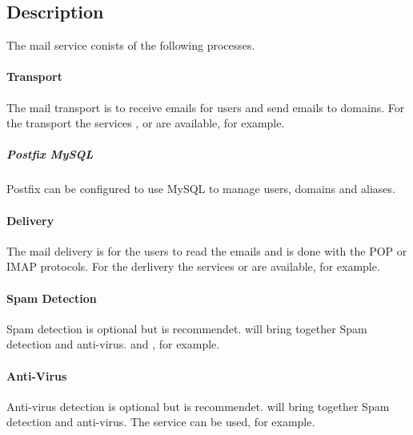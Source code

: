 \subsection{Description}

The mail service conists of the following processes.

\paragraph{Transport}

The mail transport is to receive emails for users and send emails to domains.
For the transport the services
\cite{sendmail},
\cite{postfix} or
\cite{exim}
are available, for example.

\subparagraph{Postfix MySQL}

Postfix can be configured to use MySQL to manage users, domains and aliases.

\paragraph{Delivery}

The mail delivery is for the users to read the emails and is done with the POP or IMAP
protocols. For the derlivery the services
\cite{dovecot} or
\cite{courier}
are available, for example.

\paragraph{Spam Detection}

Spam detection is optional but is recommendet.
\cite{amavisd} will bring together Spam detection and anti-virus.
\cite{SpamAssassin}
and \cite{postgrey}, for example.

\paragraph{Anti-Virus}

Anti-virus detection is optional but is recommendet.
 will bring together Spam detection and anti-virus.
The service \cite{clam-av} can be used, for example.

